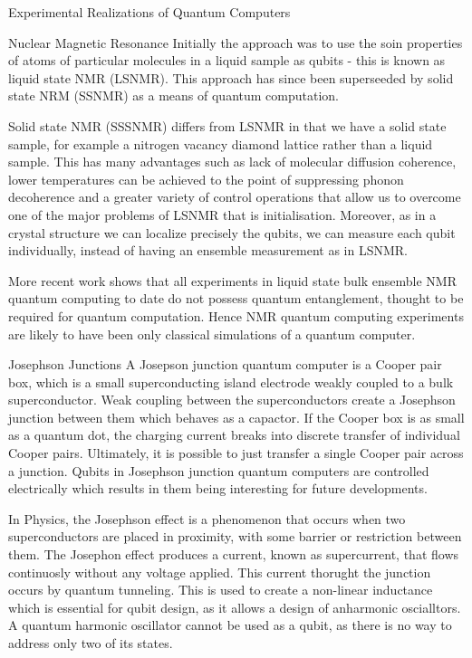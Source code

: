 \documentclass[aps,twocolumn,preprintnumbers]{revtex4}
\begin{document}
\begin{section}{Experimental Realizations of Quantum Computers}
\begin{subsection}{Nuclear Magnetic Resonance}
Initially the approach was to use the soin properties of atoms of particular molecules in a liquid sample as qubits - 
this is known as liquid state NMR (LSNMR). 
This approach has since been superseeded by solid state NRM (SSNMR) as a means of quantum computation.

Solid state NMR (SSSNMR) differs from LSNMR in that we have a solid state sample, 
for example a nitrogen vacancy diamond lattice rather than a liquid sample. 
This has many advantages such as lack of molecular diffusion coherence, 
lower temperatures can be achieved to the point of suppressing phonon decoherence and a greater variety of control operations that allow us to overcome one of the major problems of LSNMR that is initialisation. 
Moreover, as in a crystal structure we can localize precisely the qubits, 
we can measure each qubit individually, 
instead of having an ensemble measurement as in LSNMR. 

More recent work shows that all experiments in liquid state bulk ensemble NMR quantum computing to date do not possess quantum entanglement, 
thought to be required for quantum computation. 
Hence NMR quantum computing experiments are likely to have been only classical simulations of a quantum computer. 
\end{subsection}

\begin{subsection}{Josephson Junctions}
A Josepson junction quantum computer is a Cooper pair box,
which is a small superconducting island electrode weakly coupled to a bulk superconductor. 
Weak coupling between the superconductors create a Josephson junction between them which behaves as a capactor. 
If the Cooper box is as small as a quantum dot, 
the charging current breaks into discrete transfer of individual Cooper pairs. 
Ultimately, it is possible to just transfer a single Cooper pair across a junction. 
Qubits in Josephson junction quantum computers are controlled electrically which results in them being interesting for future developments.

In Physics, the Josephson effect is a phenomenon that occurs when two superconductors are placed in proximity, 
with some barrier or restriction between them. 
The Josephon effect produces a current, known as supercurrent, that flows continuosly without any voltage applied. 
This current thorught the junction occurs by quantum tunneling. 
This is used to create a non-linear inductance which is essential for qubit design, 
as it allows a design of anharmonic oscialltors. 
A quantum harmonic oscillator cannot be used as a qubit, 
as there is no way to address only two of its states. 
\end{subsection}


\end{section}
\end{document}

